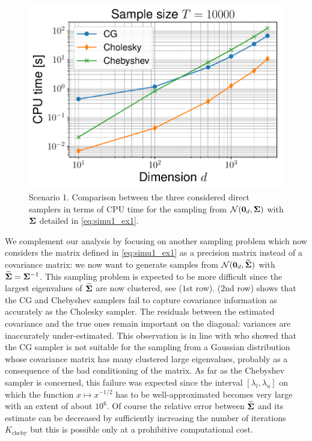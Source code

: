 \documentclass[nohypdvips,onefignum,onetabnum]{siamart171218}
\begin{document}
\begin{figure}
  \mbox{{\includegraphics[scale=0.4]{images/simu1_ex1_time_10000.pdf}}}
\caption{Scenario 1. Comparison between the three considered direct samplers in terms of CPU time for the sampling from $\mathcal{N}(\mathbf{0}_d,\mathbf{\Sigma})$ with $\mathbf{\Sigma}$ detailed in \cref{eq:simu1_ex1}.}
  \label{fig:simu1_time}
\end{figure}

We complement our analysis by focusing on another sampling problem which now considers the matrix defined in \cref{eq:simu1_ex1} as a precision matrix instead of a covariance matrix: we now want to generate samples from  $\mathcal{N}(\mathbf{0}_d,\widetilde{\mathbf{\Sigma}})$ with $\widetilde{\mathbf{\Sigma}} =  \mathbf{\Sigma}^{-1}$. 
This sampling problem is expected to be more difficult since the largest eigenvalues of $\widetilde{\mathbf{\Sigma}}$ are now clustered, see  ($1$st row).
 ($2$nd row) shows that the CG and Chebyshev samplers fail to capture covariance information as accurately as the Cholesky sampler.
The residuals between the estimated covariance and the true ones remain important on the diagonal: variances are inaccurately under-estimated. 
This observation is in line with \cite{Parker2012} who showed that the CG sampler is not suitable for the sampling from a Gaussian distribution whose covariance matrix has many clustered large eigenvalues, probably as a consequence of the bad conditioning of the matrix.
As far as the Chebyshev sampler is concerned, this failure was expected since the interval $[\lambda_l,\lambda_u]$ on which the function $x \mapsto x^{-1/2}$ has to be well-approximated becomes very large with an extent of about $10^6$. Of course the relative error between $\widetilde{\mathbf{\Sigma}}$ and its estimate can be decreased by sufficiently increasing  the number of iterations $K_{\mathrm{cheby}}$ but this is possible only at a prohibitive computational cost.
\end{document}
